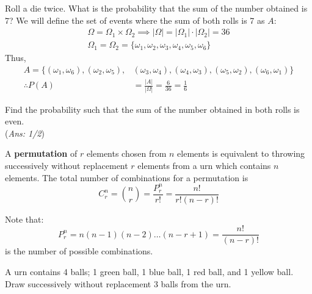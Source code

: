 \documentclass{article}
\begin{document}
	\begin{exmp}
		Roll a die twice. What is the probability that the sum of the number obtained is 7? We will define the set of events where the sum of both rolls is 7 as $A$:
		\begin{align*}
			\Omega = \Omega_1 \times \Omega_2 \implies |\Omega| = |\Omega_1| \cdot |\Omega_2| = 36 \\
			\Omega_1 = \Omega_2 = \{ \omega_1, \omega_2, \omega_3, \omega_4, \omega_5, \omega_6 \}
		\end{align*}
		Thus,
		\begin{align*}
			A = \{ (\omega_1, \omega_6), (\omega_2, \omega_5), &(\omega_3, \omega_4), (\omega_4, \omega_3), (\omega_5, \omega_2), (\omega_6, \omega_1)  \} \\
			\therefore P(A) &= \frac{|A|}{|\Omega|} = \frac{6}{36} = \frac16
		\end{align*}
	\end{exmp}
	\begin{exe}
		Find the probability such that the sum of the number obtained in both rolls is even. 
		\\
		(\emph{Ans: 1/2})
	\end{exe}
	\begin{defn}
		A \textbf{permutation} of $r$ elements chosen from $n$ elements is equivalent to throwing successively without replacement $r$ elements from a urn which contains $n$ elements. The total number of combinations for a permutation is
		$$ C_r^n = \binom{n}{r} = \frac{P_r^n}{r!} = \frac{n!}{r! (n-r)!} $$
	\end{defn}
	Note that:
	$$ P_r^n = n(n-1)(n-2)\dots (n-r+1) = \frac{n!}{(n-r)!}$$
	is the number of possible combinations.
	\begin{exmp}
		A urn contains 4 balls; 1 green ball, 1 blue ball, 1 red ball, and 1 yellow ball. Draw successively without replacement 3 balls from the urn.
	\end{exmp}
\end{document}
